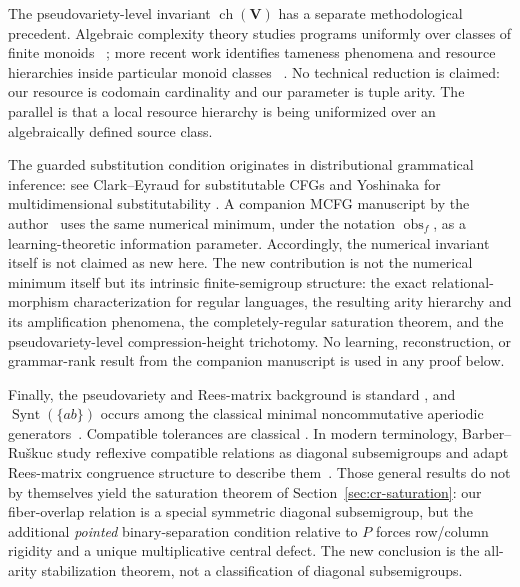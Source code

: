 \documentclass[10pt,a4paper]{article}
\theoremstyle{definition}
\theoremstyle{remark}
\newcommand{\obs}{\operatorname{obs}}
\begin{document}
The pseudovariety-level invariant $\operatorname{ch}(\mathbf V)$ has a
separate methodological precedent.  Algebraic complexity theory studies
programs uniformly over classes of finite monoids%
~\cite{BarringtonTherien1988}; more recent work identifies tameness phenomena
and resource hierarchies inside particular monoid classes%
~\cite{GrosshansMcKenzieSegoufin2017}.  No technical reduction is claimed: our
resource is codomain cardinality and our parameter is tuple arity.  The
parallel is that a local resource hierarchy is being uniformized over an
algebraically defined source class.

The guarded substitution condition originates in distributional grammatical
inference: see Clark--Eyraud for substitutable CFGs and Yoshinaka for
multidimensional substitutability
\cite{ClarkEyraud2007,Yoshinaka2009,Yoshinaka2011}.  A companion MCFG
manuscript by the author~\cite{KuriyamaMCFG2026} uses the same numerical
minimum, under the notation \(\obs_f\), as a learning-theoretic information
parameter.  Accordingly, the numerical invariant itself is not claimed as
new here.  The new contribution is not the numerical minimum itself but its
intrinsic finite-semigroup structure: the exact relational-morphism
characterization for regular languages, the resulting arity hierarchy and its
amplification phenomena, the completely-regular saturation theorem, and the
pseudovariety-level compression-height trichotomy.  No learning,
reconstruction, or grammar-rank result from the companion manuscript is used
in any proof below.

Finally, the pseudovariety and Rees-matrix background is standard
\cite{Pin1986,Almeida1994,RhodesSteinberg2009,Howie1995,Petrich1969,
Petrich1974}, and \(\operatorname{Synt}(\{ab\})\) occurs among the classical
minimal noncommutative aperiodic generators~\cite{MargolisPin1984}.
Compatible tolerances are classical
\cite{ZelinkaTolerance1975,Pondelicek1978,Loganathan1986,KumaresanTolerance1984}.  In modern
terminology, Barber--Ru\v{s}kuc study reflexive compatible relations as
diagonal subsemigroups and adapt Rees-matrix congruence structure to describe
them~\cite{BarberRuskucDirectSquare,BarberRuskucDiagonal2026}.  Those general results do not by themselves yield the saturation theorem
of Section~\ref{sec:cr-saturation}: our fiber-overlap relation is a
special symmetric diagonal subsemigroup, but the additional \emph{pointed}
binary-separation condition relative to \(P\) forces row/column rigidity and a
unique multiplicative central defect.  The new conclusion is the all-arity
stabilization theorem, not a classification of diagonal subsemigroups.
\end{document}
